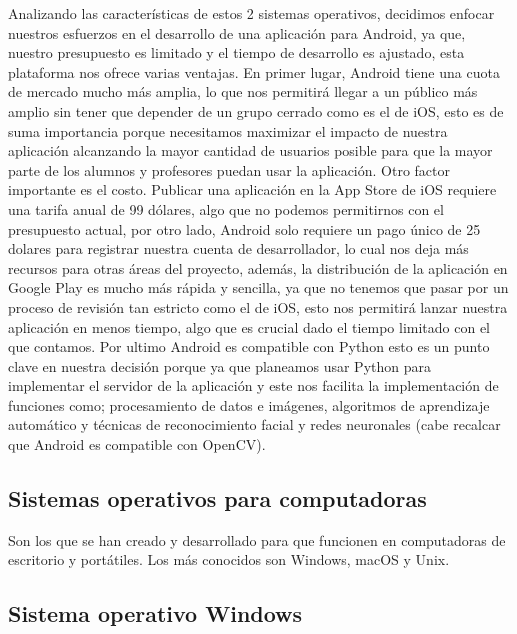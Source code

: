     Analizando las características de estos 2 sistemas operativos, decidimos enfocar nuestros esfuerzos en el desarrollo de una aplicación para Android, ya que, nuestro presupuesto es limitado y el tiempo de desarrollo es ajustado, esta plataforma nos ofrece varias ventajas. En primer lugar, Android tiene una cuota de mercado mucho más amplia, lo que nos permitirá llegar a un público más amplio sin tener que depender de un grupo cerrado como es el de iOS, esto es de suma importancia porque necesitamos maximizar el impacto de nuestra aplicación alcanzando la mayor cantidad de usuarios posible para que la mayor parte de los alumnos y profesores puedan usar la aplicación.
    Otro factor importante es el costo. Publicar una aplicación en la App Store de iOS requiere una tarifa anual de 99 dólares, algo que no podemos permitirnos con el presupuesto actual, por otro lado, Android solo requiere un pago único de 25 dolares para registrar nuestra cuenta de desarrollador, lo cual nos deja más recursos para otras áreas del proyecto, además, la distribución de la aplicación en Google Play es mucho más rápida y sencilla, ya que no tenemos que pasar por un proceso de revisión tan estricto como el de iOS, esto nos permitirá lanzar nuestra aplicación en menos tiempo, algo que es crucial dado el tiempo limitado con el que contamos.
    Por ultimo Android es compatible con Python esto es un punto clave en nuestra decisión porque ya que planeamos usar Python para implementar el servidor de la aplicación y este nos facilita la implementación de funciones como; procesamiento de datos e imágenes, algoritmos de aprendizaje automático y técnicas de reconocimiento facial y redes neuronales (cabe recalcar que Android es compatible con OpenCV).
    

\subsection{Sistemas operativos para computadoras}

Son los que se han creado y desarrollado para que funcionen en computadoras de escritorio y portátiles. Los más conocidos son Windows, macOS y Unix.

\subsection{Sistema operativo Windows}

